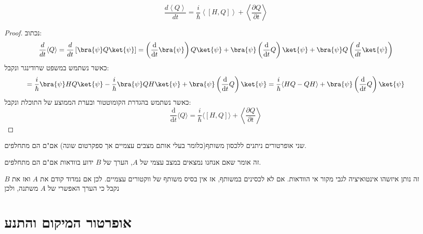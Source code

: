 \documentclass{tstextbook}
\begin{document}
\begin{proposition}
$$\frac{d\left<Q\right>}{d t}=\frac{i}{\hbar}\left<[H,Q]\right>+\left<\frac{\partial Q}{\partial t}\right>$$

\end{proposition}
\begin{proof}
נכתוב:
\begin{gather*}\frac{d}{dt}\langle Q \rangle =\frac{d}{dt}\left[ \bra{\psi} Q\ket{\psi}  \right]=\left( \frac{\mathrm{d} }{\mathrm{d} t} \bra{\psi} \right) Q\ket{\psi} +\bra{\psi} \left( \frac{\mathrm{d} }{\mathrm{d} t} Q \right)\ket{\psi} +\bra{\psi} Q\left( \frac{d}{dt}\ket{\psi}  \right) 
\end{gather*}
כאשר נשתמש במשפט שרודינגר ונקבל:
$$=\frac{i}{\hbar}\bra{\psi} HQ \ket{\psi} -\frac{i}{\hbar}\bra{\psi} QH \ket{\psi} +\bra{\psi} \left( \frac{\mathrm{d} }{\mathrm{d} t} Q \right)\ket{\psi} =\frac{i}{\hbar}\langle HQ-QH \rangle +\bra{\psi} \left( \frac{\mathrm{d} }{\mathrm{d} t} Q \right)\ket{\psi}   $$
כאשר נשתמש בהגדרת הקומוטטור ובערת הממוצע של התוכלת ונקבל:
$$\frac{\mathrm{d} }{\mathrm{d} t} \langle Q \rangle =\frac{i}{\hbar}\langle [H,Q] \rangle + \left\langle  \frac{\partial Q}{\partial t}   \right\rangle $$

\end{proof}
\begin{proposition}
שני אופרטורים ניתנים ללכסון משותף(כלומר בעלי אותם מצבים עצמיים אך ספקרטום שונה) אם"ם הם מתחלפים.

\end{proposition}
\begin{remark}
זה אומר שאם אנחנו נמצאים במצב עצמי של \(A\), הערך של \(B\) ידוע בוודאות אם"ם הם מתחלפים.

\end{remark}
זה נותן איזשהו אינטואיציה לגבי מקור אי הוודאות. אם לא לכסינים במשותף, אז אין בסיס משותף של ווקטורים עצמיים. לכן אם נמדוד קודם את \(A\) ואז את \(B\) נקבל כי הערך האפשרי של \(A\) משתנה, ולכן 

\section{אופרטור המיקום והתנע}
\end{document}
